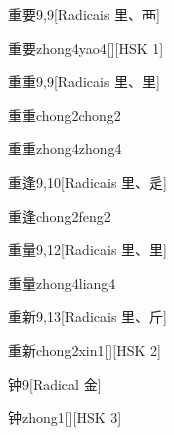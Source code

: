 \begin{entry}{重要}{9,9}[Radicais ⾥、⾑]
  \begin{phonetics}{重要}{zhong4yao4}[][HSK 1]
  \end{phonetics}
\end{entry}

\begin{entry}{重重}{9,9}[Radicais ⾥、⾥]
  \begin{phonetics}{重重}{chong2chong2}
  \end{phonetics}
  \begin{phonetics}{重重}{zhong4zhong4}
  \end{phonetics}
\end{entry}

\begin{entry}{重逢}{9,10}[Radicais ⾥、⾡]
  \begin{phonetics}{重逢}{chong2feng2}
  \end{phonetics}
\end{entry}

\begin{entry}{重量}{9,12}[Radicais ⾥、⾥]
  \begin{phonetics}{重量}{zhong4liang4}
  \end{phonetics}
\end{entry}

\begin{entry}{重新}{9,13}[Radicais ⾥、⽄]
  \begin{phonetics}{重新}{chong2xin1}[][HSK 2]
  \end{phonetics}
\end{entry}

\begin{entry}{钟}{9}[Radical ⾦]
  \begin{phonetics}{钟}{zhong1}[][HSK 3]
  \end{phonetics}
\end{entry}

